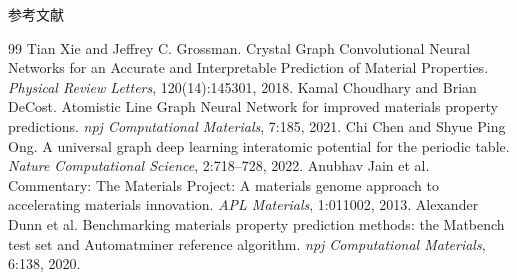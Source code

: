 \documentclass[aspectratio=169]{beamer}
\begin{document}
\begin{frame}[allowframebreaks]{参考文献}
\footnotesize
\begin{thebibliography}{99}
 Tian Xie and Jeffrey C. Grossman. Crystal Graph Convolutional Neural Networks for an Accurate and Interpretable Prediction of Material Properties. \textit{Physical Review Letters}, 120(14):145301, 2018.
 Kamal Choudhary and Brian DeCost. Atomistic Line Graph Neural Network for improved materials property predictions. \textit{npj Computational Materials}, 7:185, 2021.
 Chi Chen and Shyue Ping Ong. A universal graph deep learning interatomic potential for the periodic table. \textit{Nature Computational Science}, 2:718--728, 2022.
 Anubhav Jain et al. Commentary: The Materials Project: A materials genome approach to accelerating materials innovation. \textit{APL Materials}, 1:011002, 2013.
 Alexander Dunn et al. Benchmarking materials property prediction methods: the Matbench test set and Automatminer reference algorithm. \textit{npj Computational Materials}, 6:138, 2020.
\end{thebibliography}
\end{frame}
\end{document}
